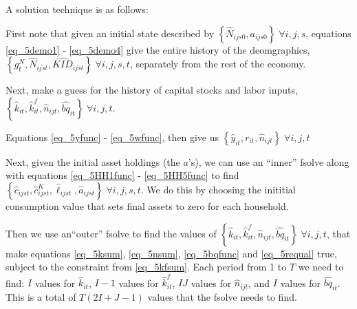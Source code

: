 \documentclass[letterpaper,12pt]{article}
\theoremstyle{definition}
\numberwithin{equation}{section}
\begin{document}
\begin{spacing}{1.5}
	A solution technique is as follows:

	First note that given an initial state described by $\left\{ \hat N_{ijs0}, a_{ijs0} \right\}\; \forall i,j,s$, equations \eqref{eq_5demo1} - \eqref{eq_5demo4} give the entire history of the deomgraphics, $\left\{ g^N_t, \hat N_{ijst}, \hat{KID}_{ijst} \right\}\; \forall i,j,s,t$, separately from the rest of the economy.

	Next, make a guess for the history of capital stocks and labor inputs, $\left\{ \hat k_{it}, \hat k^f_{it}, \hat n_{ijt}, \hat{bq}_{it} \right\}\; \forall i,j,t$.

	Equations \eqref{eq_5yfunc} - \eqref{eq_5wfunc}, then give us $\left\{ \hat y_{it}, r_{it}, \hat n_{ijt} \right\}\; \forall i,j,t$

	Next, given the initial asset holdings (the $a$'s), we can use an ``inner'' fsolve along with equations \eqref{eq_5HH1func} - \eqref{eq_5HH5func} to find $\left\{ \hat c_{ijst}, \hat c^K_{ijst}, \hat \ell_{ijst}, \hat a_{ijst} \right\}\; \forall i,j,s,t$.  We do this by choosing the inititial consumption value that sets final assets to zero for each household.

	Then we use an``outer'' fsolve to find the values of $\left\{ \hat k_{it}, \hat k^f_{it}, \hat n_{ijt}, \hat{bq}_{it} \right\}\; \forall i,j,t$, that make equations \eqref{eq_5ksum}, \eqref{eq_5nsum}, \eqref{eq_5bqfunc} and \eqref{eq_5requal} true, subject to the constraint from \eqref{eq_5kfsum}.  Each period from 1 to $T$ we need to find: $I$ values for $\hat k_{it}$, $I-1$ values for $\hat k^f_{it}$, $IJ$ values for $\hat n_{ijt}$, and $I$ values for $\hat{bq}_{it}$.  This is a total of $T(2I+J-1)$ values that the fsolve needs to find.



	


\end{spacing}
\end{document}
